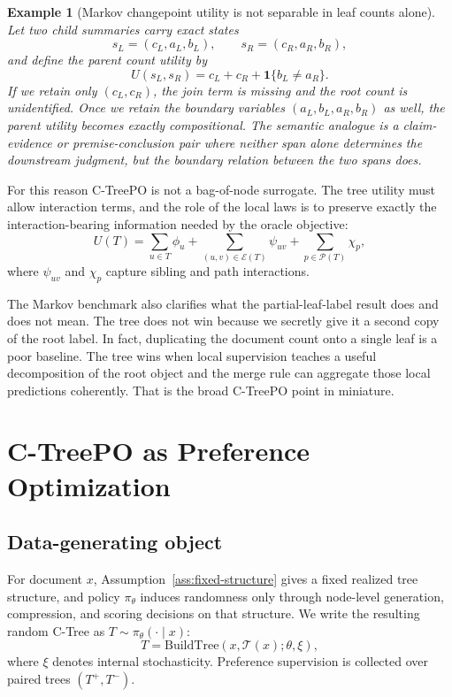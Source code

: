 \documentclass[11pt]{article}
\newtheorem{example}{Example}
\begin{document}
\begin{example}[Markov changepoint utility is not separable in leaf counts alone]\label{ex:threshold-nonseparable}
Let two child summaries carry exact states
\[
s_L=(c_L,a_L,b_L),\qquad s_R=(c_R,a_R,b_R),
\]
and define the parent count utility by
\[
U(s_L,s_R)=c_L+c_R+\mathbf{1}\{b_L\neq a_R\}.
\]
If we retain only $(c_L,c_R)$, the join term is missing and the root count is unidentified. Once we retain the boundary variables $(a_L,b_L,a_R,b_R)$ as well, the parent utility becomes exactly compositional. The semantic analogue is a claim-evidence or premise-conclusion pair where neither span alone determines the downstream judgment, but the boundary relation between the two spans does.
\end{example}

For this reason C-TreePO is not a bag-of-node surrogate. The tree utility must allow interaction terms, and the role of the local laws is to preserve exactly the interaction-bearing information needed by the oracle objective:
\[
U(T)=\sum_{u\in T}\phi_u + \sum_{(u,v)\in\mathcal{E}(T)}\psi_{uv} + \sum_{p\in\mathcal{P}(T)}\chi_p,
\]
where $\psi_{uv}$ and $\chi_p$ capture sibling and path interactions.

The Markov benchmark also clarifies what the partial-leaf-label result does and does not mean. The tree does not win because we secretly give it a second copy of the root label. In fact, duplicating the document count onto a single leaf is a poor baseline. The tree wins when local supervision teaches a useful decomposition of the root object and the merge rule can aggregate those local predictions coherently. That is the broad C-TreePO point in miniature.

\section{C-TreePO as Preference Optimization}\label{sec:po-mapping}

\subsection{Data-generating object}

For document $x$, Assumption~\ref{ass:fixed-structure} gives a fixed realized tree structure, and policy $\pi_\theta$ induces randomness only through node-level generation, compression, and scoring decisions on that structure. We write the resulting random C-Tree as $T\sim\pi_\theta(\cdot\mid x)$:
\[
T = \mathrm{BuildTree}(x,\mathcal{T}(x);\theta,\xi),
\]
where $\xi$ denotes internal stochasticity. Preference supervision is collected over paired trees $(T^+,T^-)$.
\end{document}
